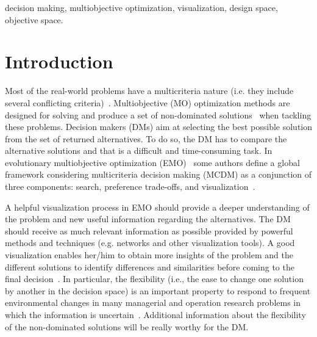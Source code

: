 \documentclass[journal]{IEEEtran}
\begin{document}
\begin{IEEEkeywords}
decision making, multiobjective optimization, visualization, design space, objective space.
\end{IEEEkeywords}


\IEEEpeerreviewmaketitle



\section{Introduction}
\label{sec:intro}

Most of the real-world problems have a multicriteria nature (i.e. they include several conflicting criteria)~\cite{Chankong83}. Multiobjective (MO) optimization methods are designed for solving and produce a set of non-dominated solutions~\cite{Coello07,Deb01} when tackling these problems. Decision makers (DMs) aim at selecting the best possible solution from the set of returned alternatives. To do so, the DM has to compare the alternative solutions and that is a difficult and time-consuming task. In evolutionary multiobjective optimization (EMO)~\cite{Coello07,Deb01} some authors define a global framework considering multicriteria decision making (MCDM) as a conjunction of three components: search, preference trade-offs, and visualization~\cite{Bonissone08}.

A helpful visualization process in EMO should provide a deeper understanding of the problem and new useful information regarding the alternatives. The DM should receive as much relevant information as possible provided by powerful methods and techniques (e.g. networks and other visualization tools). A good visualization enables her/him to obtain more insights of the problem and the different solutions to identify differences and similarities before coming to the final decision~\cite{Miettinen14}. In particular, the flexibility (i.e., the ease to change one solution by another in the decision space) is an important property to respond to frequent environmental changes in many managerial and operation research problems in which the information is uncertain~\cite{Chica16OMEGA}. Additional information about the flexibility of the non-dominated solutions will be really worthy for the DM.
\end{document}
